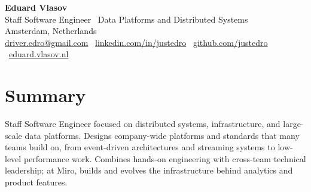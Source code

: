 \documentclass[a4paper,10pt]{article}
\makeatletter
\newcommand{\ehB}{ail}
\newcommand{\euC}{er.}
\newcommand{\ehD}{om}
\newcommand{\euA}{dr}
\newcommand{\euE}{ed}
\newcommand{\ehA}{gm}
\newcommand{\euD}{ro}
\newcommand{\ehC}{.c}
\newcommand{\euB}{iv}
\newcommand{\emailuser}{\euA\euB\euC\euE\euD}
\newcommand{\emailhost}{\ehA\ehB\ehC\ehD}
\newcommand{\resumeemail}{\emailuser @\emailhost}
\makeatother
\begin{document}
\begin{center}
  {\LARGE\textbf{Eduard Vlasov}}\\[0.25em]
  {\large Staff Software Engineer \textbar\ Data Platforms and Distributed Systems}\\[0.45em]
  \small Amsterdam, Netherlands\\[0.3em]
  \href{mailto:\resumeemail}{\resumeemail} \textbar\
  \href{https://www.linkedin.com/in/justedro}{linkedin.com/in/justedro} \textbar\
  \href{https://github.com/justedro}{github.com/justedro} \textbar\
  \href{https://eduard.vlasov.nl}{eduard.vlasov.nl}
\end{center}

\section{Summary}
Staff Software Engineer focused on distributed systems, infrastructure, and large-scale data platforms. Designs company-wide platforms and standards that many teams build on, from event-driven architectures and streaming systems to low-level performance work. Combines hands-on engineering with cross-team technical leadership; at Miro, builds and evolves the infrastructure behind analytics and product features.
\end{document}
